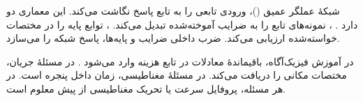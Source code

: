 \label{sec:theory-forward-operators}

شبکهٔ عملگر عمیق ()، ورودی تابعی را به تابع پاسخ نگاشت می‌کند.
این معماری دو  دارد \cite{lu2021deeponet}.
، نمونه‌های تابع را به ضرایب آموخته‌شده تبدیل می‌کند.
، توابع پایه را در مختصات خواسته‌شده ارزیابی می‌کند.
ضرب داخلی ضرایب و پایه‌ها، پاسخ شبکه را می‌سازد.

در آموزش فیزیک‌آگاه، باقیماندهٔ معادلات در تابع هزینه وارد می‌شود \cite{wang2021pideeponet}.
در مسئلهٔ جریان،  مختصات مکانی را دریافت می‌کند.
در مسئلهٔ مغناطیسی،  زمان داخل پنجره است.
در هر مسئله، پروفایل سرعت یا تحریک مغناطیسی از پیش معلوم است.

